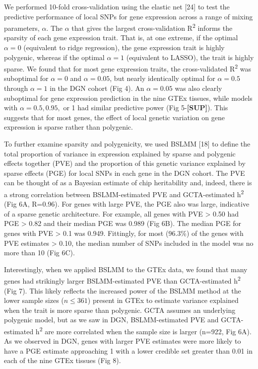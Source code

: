 \documentclass[]{article}
\begin{document}
We performed 10-fold cross-validation using the elastic net {[}24{]} to
test the predictive performance of local SNPs for gene expression across
a range of mixing parameters, \(\alpha\). The \(\alpha\) that gives the
largest cross-validation R\textsuperscript{2} informs the sparsity of
each gene expression trait. That is, at one extreme, if the optimal
\(\alpha=0\) (equivalent to ridge regression), the gene expression trait
is highly polygenic, whereas if the optimal \(\alpha=1\) (equivalent to
LASSO), the trait is highly sparse. We found that for most gene
expression traits, the cross-validated R\textsuperscript{2} was
suboptimal for \(\alpha=0\) and \(\alpha=0.05\), but nearly identically
optimal for \(\alpha=0.5\) through \(\alpha=1\) in the DGN cohort (Fig
4). An \(\alpha=0.05\) was also clearly suboptimal for gene expression
prediction in the nine GTEx tissues, while models with
\(\alpha=0.5,0.95,\) or 1 had similar predictive power (Fig
5-\textbf{{[}SUP{]}}). This suggests that for most genes, the effect of
local genetic variation on gene expression is sparse rather than
polygenic.

To further examine sparsity and polygenicity, we used BSLMM {[}18{]} to
define the total proportion of variance in expression explained by
sparse and polygenic effects together (PVE) and the proportion of this
genetic variance explained by sparse effects (PGE) for local SNPs in
each gene in the DGN cohort. The PVE can be thought of as a Bayesian
estimate of chip heritability and, indeed, there is a strong correlation
between BSLMM-estimated PVE and GCTA-estimated h\textsuperscript{2} (Fig
6A, R=0.96). For genes with large PVE, the PGE also was large,
indicative of a sparse genetic architecture. For example, all genes with
PVE \textgreater{} 0.50 had PGE \textgreater{} 0.82 and their median PGE
was 0.989 (Fig 6B). The median PGE for genes with PVE \textgreater{} 0.1
was 0.949. Fittingly, for most (96.3\%) of the genes with PVE estimates
\textgreater{} 0.10, the median number of SNPs included in the model was
no more than 10 (Fig 6C).

Interestingly, when we applied BSLMM to the GTEx data, we found that
many genes had strikingly larger BSLMM-estimated PVE than GCTA-estimated
h\textsuperscript{2} (Fig 7). This likely reflects the increased power
of the BSLMM method at the lower sample sizes (\(n \leq 361\)) present
in GTEx to estimate variance explained when the trait is more sparse
than polygenic. GCTA assumes an underlying polygenic model, but as we
saw in DGN, BSLMM-estimated PVE and GCTA-estimated h\textsuperscript{2}
are more correlated when the sample size is larger (n=922, Fig 6A). As
we observed in DGN, genes with larger PVE estimates were more likely to
have a PGE estimate approaching 1 with a lower credible set greater than
0.01 in each of the nine GTEx tissues (Fig 8).
\end{document}
